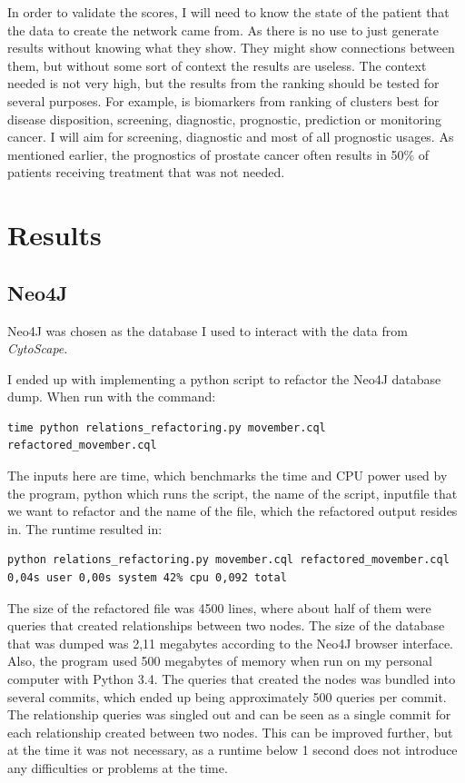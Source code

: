 \documentclass[UKenglish]{ifimaster}
\begin{document}
In order to validate the scores, I will need to know the state of the patient
that the data to create the network came from. As there is no use to just
generate results without knowing what they show. They might show connections
between them, but without some sort of context the results are useless. The
context needed is not very high, but the results from the ranking should be
tested for several purposes. For example, is biomarkers from ranking of clusters
best for disease disposition, screening, diagnostic, prognostic, prediction or
monitoring cancer. I will aim for screening, diagnostic and most of all
prognostic usages. As mentioned earlier, the prognostics of prostate cancer
often results in 50\% of patients receiving treatment that was not needed.

\part{Results}
\chapter{Neo4J}
Neo4J was chosen as the database I used to interact with the data from
\textit{CytoScape}.

I ended up with implementing a python script to refactor the Neo4J database
dump. When run with the command:
\begin{verbatim}
time python relations_refactoring.py movember.cql refactored_movember.cql
\end{verbatim}
The inputs here are time, which benchmarks the time and CPU power used by the
program, python which runs the script, the name of the script, inputfile that we
want to refactor and the name of the file, which the refactored output resides
in.  The runtime resulted in:
\begin{verbatim}
python relations_refactoring.py movember.cql refactored_movember.cql
0,04s user 0,00s system 42% cpu 0,092 total
\end{verbatim}
The size of the refactored file was 4500 lines, where about half of them were
queries that created relationships between two nodes. The size of the database
that was dumped was 2,11 megabytes according to the Neo4J browser interface.
Also, the program used 500 megabytes of memory when run on my personal computer
with Python 3.4. The queries that created the nodes was bundled into several
commits, which ended up being approximately 500 queries per commit. The
relationship queries was singled out and can be seen as a single commit for each
relationship created between two nodes. This can be improved further, but at the
time it was not necessary, as a runtime below 1 second does not introduce any
difficulties or problems at the time.
\end{document}
